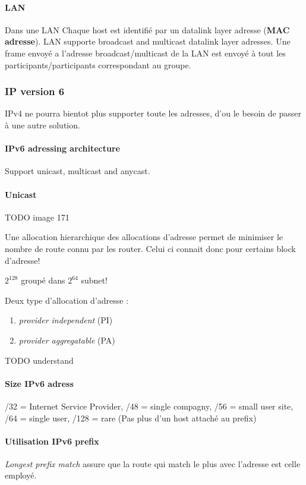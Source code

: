 \paragraph{LAN} Dans une LAN Chaque host est identifié par un datalink layer adresse
(\textbf{MAC adresse}).
LAN supporte broadcast and multicast datalink layer adresses. Une frame envoyé a l'adresse
broadcast/multicast de la LAN est envoyé à tout les participants/participants correspondant
au groupe.

\subsubsection{IP version 6}
IPv4 ne pourra bientot plus supporter toute les adresses, d'ou le besoin
de passer à une autre solution.

\paragraph{IPv6 adressing architecture}
Support unicast, multicast and anycast.

\paragraph{Unicast}
TODO image 171

Une allocation hierarchique des allocations d'adresse permet de minimiser
le nombre de route connu par les router. Celui ci connait donc pour
certains block d'adresse!

$2^{128}$ groupé dans $2^{64}$ subnet!


Deux type d'allocation d'adresse :
\begin{enumerate}
    \item \textit{provider independent} (PI)
    \item \textit{provider aggregatable} (PA)
\end{enumerate}
TODO understand

\paragraph{Size IPv6 adress}
/32 = Internet Service Provider, /48 = single compagny, /56 = small user site,
/64 = single user, /128 = rare (Pas plus d'un host attaché au prefix)

\paragraph{Utilisation IPv6 prefix}
\textit{Longest prefix match} assure que la route qui match le plus avec
l'adresse est celle employé.

